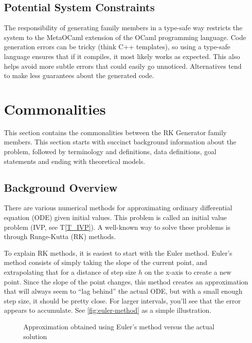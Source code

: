 \documentclass[12pt]{article}
\newcommand{\tref}[1]{T\ref{#1}}
\newcommand{\famname}{RK Generator} %
\begin{document}
\subsection{Potential System Constraints}

The responsibility of generating family members in a type-safe way restricts 
the system to the MetaOCaml extension of the OCaml programming language.
Code generation errors can be tricky (think C++ templates), so using a 
type-safe language ensures that if it compiles, it most likely works as 
expected.
This also helps avoid more subtle errors that could easily go unnoticed.
Alternatives tend to make less guarantees about the generated code.
\section{Commonalities}

This section contains the commonalities between the \famname{} family members. 
This section starts with succinct background information about the problem, 
followed by terminology and definitions, data definitions, goal statements and 
ending with theoretical models. 

\subsection{Background Overview} \label{Sec_Background}

There are various numerical methods for approximating ordinary differential 
equation (ODE) given initial values. This problem is called an initial value 
problem (IVP, see \tref{T_IVP}). A well-known way to solve these problems is 
through Runge-Kutta (RK) methods.%

To explain RK methods, it is easiest to start with the Euler method. Euler's 
method consists of simply taking the slope of the current point, and 
extrapolating that for a distance of step size $h$ on the x-axis to create a 
new point. Since the slope of the point changes, this method creates an 
approximation that will always seem to ``lag behind'' the actual ODE, but with 
a small enough step size, it should be pretty close. For larger intervals, 
you'll see that the error appears to accumulate. See
\autoref{fig:euler-method} as a simple illustration.

\begin{figure}[htb]
  \centering
  \def\svgwidth{0.5\textwidth}
  
  \caption{Approximation obtained using Euler's method versus the actual 
  solution}
  \label{fig:euler-method}
\end{figure}
\end{document}
